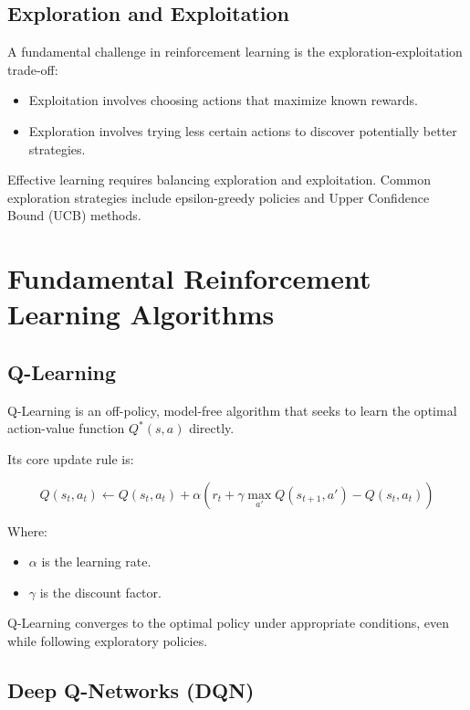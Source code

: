 \documentclass[openany]{book}
\begin{document}
\subsection{Exploration and Exploitation}

A fundamental challenge in reinforcement learning is the 
exploration-exploitation trade-off:

\begin{itemize}
    \item Exploitation involves choosing actions that maximize known rewards.
    \item Exploration involves trying less certain actions to discover 
    potentially better strategies.
\end{itemize}

Effective learning requires balancing exploration and exploitation. Common 
exploration strategies include epsilon-greedy policies and Upper Confidence 
Bound (UCB) methods.

\section{Fundamental Reinforcement Learning Algorithms}

\subsection{Q-Learning}

Q-Learning is an off-policy, model-free algorithm that seeks to learn the 
optimal action-value function \( Q^*(s,a) \) directly.

Its core update rule is:

\[
Q(s_t, a_t) \leftarrow Q(s_t, a_t) + \alpha \left( r_t + \gamma \max_{a'} 
Q(s_{t+1}, a') - Q(s_t, a_t) \right)
\]

Where:

\begin{itemize}
    \item \( \alpha \) is the learning rate.
    \item \( \gamma \) is the discount factor.
\end{itemize}

Q-Learning converges to the optimal policy under appropriate conditions, even 
while following exploratory policies.

\subsection{Deep Q-Networks (DQN)}
\end{document}
